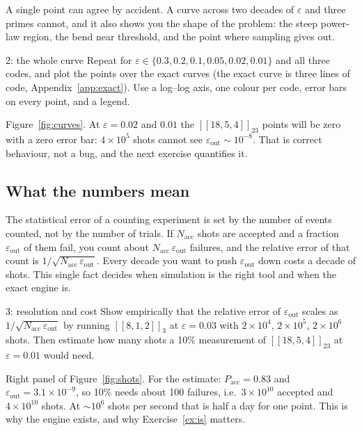 \documentclass[11pt]{article}
\newcommand{\eps}{\varepsilon}
\begin{document}
A single point can agree by accident. A curve across two decades of $\eps$ and
three primes cannot, and it also shows you the shape of the problem: the steep
power-law region, the bend near threshold, and the point where sampling gives out.

\begin{exercise}{2: the whole curve}
Repeat for $\eps\in\{0.3,0.2,0.1,0.05,0.02,0.01\}$ and all three codes, and plot the
points over the exact curves (the exact curve is three lines of code,
Appendix~\ref{app:exact}). Use a log--log axis, one colour per code, error bars on
every point, and a legend.
\end{exercise}
\begin{checkbox}
Figure~\ref{fig:curves}. At $\eps = 0.02$ and $0.01$ the $[[18,5,4]]_{23}$ points will
be zero with a zero error bar: $4\times10^{5}$ shots cannot see $\eps_{\mathrm{out}}
\sim 10^{-8}$. That is correct behaviour, not a bug, and the next exercise
quantifies it.
\end{checkbox}

\subsection*{What the numbers mean}

The statistical error of a counting experiment is set by the number of events
counted, not by the number of trials. If $N_{\mathrm{acc}}$ shots are accepted and a
fraction $\eps_{\mathrm{out}}$ of them fail, you count about
$N_{\mathrm{acc}}\,\eps_{\mathrm{out}}$ failures, and the relative error of that
count is $1/\sqrt{N_{\mathrm{acc}}\,\eps_{\mathrm{out}}}$. Every decade you want to
push $\eps_{\mathrm{out}}$ down costs a decade of shots. This single fact decides
when simulation is the right tool and when the exact engine is.

\begin{exercise}{3: resolution and cost}
Show empirically that the relative error of $\eps_{\mathrm{out}}$ scales as
$1/\sqrt{N_{\mathrm{acc}}\,\eps_{\mathrm{out}}}$ by running $[[8,1,2]]_3$ at
$\eps=0.03$ with $2\times10^{4}$, $2\times10^{5}$, $2\times10^{6}$ shots. Then
estimate how many shots a 10\% measurement of $[[18,5,4]]_{23}$ at $\eps=0.01$ would
need.
\end{exercise}
\begin{checkbox}
Right panel of Figure~\ref{fig:shots}. For the estimate: $P_{\mathrm{acc}}=0.83$ and
$\eps_{\mathrm{out}}=3.1\times10^{-9}$, so 10\% needs about 100 failures, i.e.\
$3\times10^{10}$ accepted and $4\times10^{10}$ shots. At $\sim10^{6}$ shots per second
that is half a day for one point. This is why the engine exists, and why
Exercise~\ref{ex:is} matters.
\end{checkbox}
\end{document}
